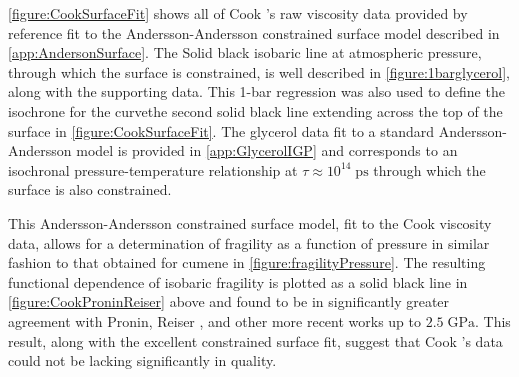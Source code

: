 \fig \nolinebreak\ref{figure:CookSurfaceFit} shows all of Cook \etal's raw viscosity data provided by reference \nolinebreak\cite{Cook2} fit to the Andersson-Andersson constrained surface model described in \app\nolinebreak \ref{app:AndersonSurface}.  The Solid black isobaric line at atmospheric pressure, through which the surface is constrained, is well described in \fig \nolinebreak \ref{figure:1barglycerol}, along with the supporting data.  This 1-bar regression was also used to define the isochrone for the \tgp curve\textemdash the second solid black line extending across the top of the surface in \fig \nolinebreak \ref{figure:CookSurfaceFit}.  The glycerol \tgp data fit to a standard Andersson-Andersson model is provided in \app\nolinebreak \ref{app:GlycerolIGP} and corresponds to an isochronal pressure-temperature relationship at $\tau\approx10^{14}\;\si{\pico\second}$ through which the surface is also constrained.  

This Andersson-Andersson constrained surface model, fit to the Cook \etal viscosity data, allows for a determination of fragility as a function of pressure in similar fashion to that obtained for cumene in \fig \nolinebreak \ref{figure:fragilityPressure}.  The resulting functional dependence of isobaric fragility is plotted as a solid black line in \fig \nolinebreak \ref{figure:CookProninReiser} above and found to be in significantly greater agreement with Pronin, Reiser \etal, and other more recent works up to $2.5\;\si{\giga\pascal}$.  This result, along with the excellent constrained surface fit, suggest that Cook \etal's data could not be lacking significantly in quality.  

